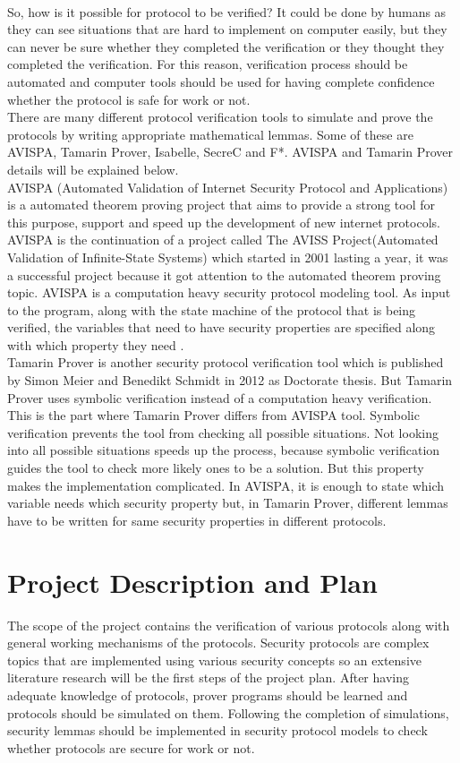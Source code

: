 \documentclass[a4paper, 12pt, titlepage]{article}
\begin{document}
\bigskip
\\ So, how is it possible for protocol to be verified? It could be done by humans as they can see situations that are hard to implement on computer easily, but they can never be sure whether they completed the verification or they thought they completed the verification. For this reason, verification process should be automated and computer tools should be used for having complete confidence whether the protocol is safe for work or not. 
\bigskip
\\ There are many different protocol verification tools to simulate and prove the protocols by writing appropriate mathematical lemmas. Some of these are AVISPA, Tamarin Prover, Isabelle\cite{isabelle}, SecreC\cite{secrec} and F*\cite{fstar}. AVISPA and Tamarin Prover details will be explained below.
\bigskip
\\ AVISPA (Automated Validation of Internet Security Protocol and Applications) is a automated theorem proving project that aims to provide a strong tool for this purpose, support and speed up the development of new internet protocols. AVISPA is the continuation of a project called The AVISS Project(Automated Validation of Infinite-State Systems) which started in 2001 lasting a year, it was a successful project because it got attention to the automated theorem proving topic. AVISPA is a computation heavy security protocol modeling tool. As input to the program, along with the state machine of the protocol that is being verified, the variables that need to have security properties are specified along with which property they need \cite{avispa}.
\bigskip
\\ Tamarin Prover is another security protocol verification tool which is published by Simon Meier and Benedikt Schmidt in 2012 as Doctorate thesis. But Tamarin Prover uses  symbolic verification instead of a computation heavy verification. This is the part where Tamarin Prover differs from AVISPA tool. Symbolic verification prevents the tool from checking all possible situations. Not looking into all possible situations speeds up the process, because symbolic verification guides the tool to check more likely ones to be a solution. But this property makes the implementation complicated. In AVISPA, it is enough to state which variable needs which security property but, in Tamarin Prover, different lemmas have to be written for same security properties in different protocols. 
\newpage
\section{Project Description and Plan}
The scope of the project contains the verification of various protocols along with general working mechanisms of the protocols. Security protocols are complex topics that are implemented using various security concepts so an extensive literature research will be the first steps of the project plan. After having adequate knowledge of protocols, prover programs should be learned and protocols should be simulated on them. Following the completion of simulations, security lemmas should be implemented in security protocol models to check whether protocols are secure for work or not.
\end{document}
